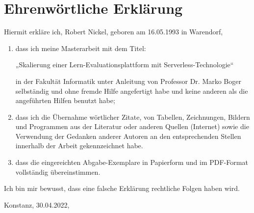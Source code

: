 \chapter*{Ehrenwörtliche Erklärung}

Hiermit erkläre ich, Robert Nickel, geboren am 16.05.1993 in Warendorf,

\begin{enumerate}
\item dass ich meine Masterarbeit mit dem Titel:

          „Skalierung einer Lern-Evaluationsplattform mit Serverless-Technologie“

	in der Fakultät Informatik unter Anleitung von Professor Dr. Marko Boger selbständig und ohne fremde Hilfe angefertigt habe und keine anderen als die angeführten Hilfen benutzt habe;

\item dass ich die Übernahme wörtlicher Zitate, von Tabellen, Zeichnungen, Bildern und Programmen aus der Literatur oder anderen Quellen (Internet) sowie die Verwendung der Gedanken anderer Autoren an den entsprechenden Stellen innerhalb der Arbeit gekennzeichnet habe.

\item dass die eingereichten Abgabe-Exemplare in Papierform und im PDF-Format vollständig übereinstimmen.
\end{enumerate}

Ich bin mir bewusst, dass eine falsche Erklärung rechtliche Folgen haben wird.
\vspace{16mm}

Konstanz, 30.04.2022, \hrulefill
